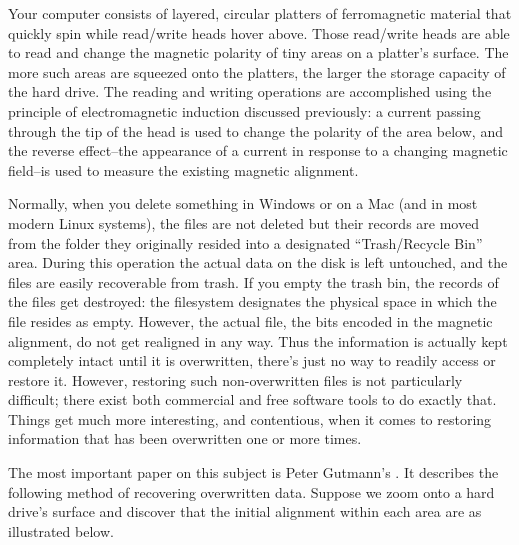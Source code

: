 



Your computer  consists of layered, circular platters of ferromagnetic material that quickly spin while read/write heads hover above. Those read/write heads are able to read and change the magnetic polarity of tiny areas on a platter's surface. The more such areas are squeezed onto the platters, the larger the storage capacity of the hard drive. The reading and writing operations are accomplished using the principle of electromagnetic induction discussed previously: a current passing through the tip of the head is used to change the polarity of the area below, and the reverse effect--the appearance of a current in response to a changing magnetic field--is used to measure the existing magnetic alignment.


Normally, when you delete something in Windows or on a Mac (and in most modern Linux systems), the files are not deleted but their records are moved from the folder they originally resided into a designated ``Trash/Recycle Bin'' area. During this operation the actual data on the disk is left untouched, and the files are easily recoverable from trash. If you empty the trash bin, the records of the files get destroyed: the filesystem designates the physical space in which the file resides as empty. However, the actual file, the bits encoded in the magnetic alignment, do not get realigned in any way. Thus the information is actually kept completely intact until it is overwritten, there's just no way to readily access or restore it. However, restoring such non-overwritten files is not particularly difficult; there exist both commercial and free software tools to do exactly that. Things get much more interesting, and contentious, when it comes to restoring information that has been overwritten one or more times.


The most important paper on this subject is Peter Gutmann's . It describes the following method of recovering overwritten data. Suppose we zoom onto a hard drive's surface and discover that the initial alignment within each area are as illustrated below.



